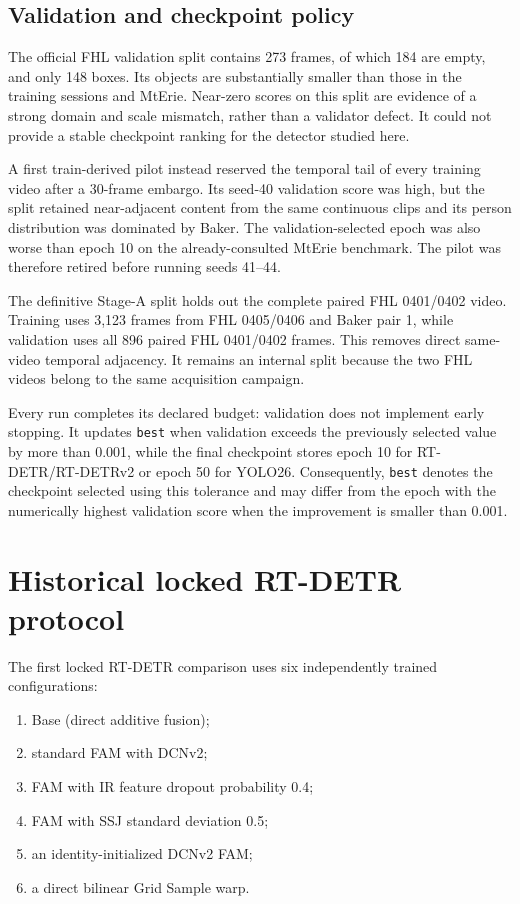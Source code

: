 \subsection{Validation and checkpoint policy}

The official FHL validation split contains 273 frames, of which 184 are empty,
and only 148 boxes. Its objects are substantially smaller than those in the
training sessions and MtErie. Near-zero scores on this split are evidence of a
strong domain and scale mismatch, rather than a validator defect. It could not
provide a stable checkpoint ranking for the detector studied here.

A first train-derived pilot instead reserved the temporal tail of every
training video after a 30-frame embargo. Its seed-40 validation score was high,
but the split retained near-adjacent content from the same continuous clips
and its person distribution was dominated by Baker. The validation-selected
epoch was also worse than epoch 10 on the already-consulted MtErie benchmark.
The pilot was therefore retired before running seeds 41--44.

The definitive Stage-A split holds out the complete paired FHL 0401/0402
video. Training uses 3,123 frames from FHL 0405/0406 and Baker pair 1, while
validation uses all 896 paired FHL 0401/0402 frames. This removes direct
same-video temporal adjacency. It remains an internal split because the two
FHL videos belong to the same acquisition campaign.

Every run completes its declared budget: validation does not implement early
stopping. It updates \texttt{best} when validation \mapfifty{} exceeds the
previously selected value by more than 0.001, while the final checkpoint stores
epoch 10 for RT-DETR/RT-DETRv2 or epoch 50 for YOLO26. Consequently, \texttt{best}
denotes the checkpoint selected using this tolerance and may differ from the epoch
with the numerically highest validation score when the improvement is smaller than 0.001.

\section{Historical locked RT-DETR protocol}
\label{sec:locked-rtdetr-protocol}

The first locked RT-DETR comparison uses six independently trained
configurations:

\begin{enumerate}[label=\arabic*.]
  \item Base (direct additive fusion);
  \item standard FAM with DCNv2;
  \item FAM with IR feature dropout probability 0.4;
  \item FAM with SSJ standard deviation 0.5;
  \item an identity-initialized DCNv2 FAM;
  \item a direct bilinear Grid Sample warp.
\end{enumerate}

